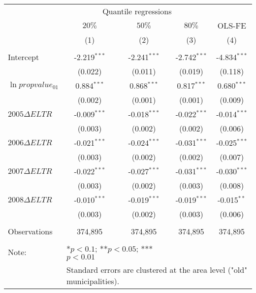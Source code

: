 \begin{table}[H]
  \centering
  \begin{tabular}{@{}lcccc@{}}
  \toprule
                         & \multicolumn{3}{c}{Quantile regressions} &           \\ \cmidrule(lr){2-4}
                         & $20\%$       & $50\%$      & $80\%$      & OLS-FE    \\
                         & (1)          & (2)         & (3)         & (4)       \\ \midrule
  \multicolumn{5}{l}{}                                                          \\
  Intercept & -2.219$^{***}$ & -2.241$^{***}$ & -2.742$^{***}$ & -4.834$^{***}$ \\
  & (0.022) & (0.011) & (0.019) & (0.118) \\
  $\ln{propvalue_{01}}$ & 0.884$^{***}$ & 0.868$^{***}$ & 0.817$^{***}$ & 0.680$^{***}$ \\
  & (0.002) & (0.001) & (0.001) & (0.009) \\
 $2005\Delta ELTR$ & -0.009$^{***}$ & -0.018$^{***}$ & -0.022$^{***}$ & -0.014$^{***}$ \\
  & (0.003) & (0.002) & (0.002) & (0.006) \\
 $2006\Delta ELTR$ & -0.021$^{***}$ & -0.024$^{***}$ & -0.031$^{***}$ & -0.025$^{***}$ \\
  & (0.003) & (0.002) & (0.002) & (0.007) \\
 $2007\Delta ELTR$ & -0.022$^{***}$ & -0.027$^{***}$ & -0.031$^{***}$ & -0.030$^{***}$ \\
  & (0.003) & (0.002) & (0.003) & (0.008) \\
 $2008\Delta ELTR$ & -0.010$^{***}$ & -0.019$^{***}$ & -0.019$^{***}$ & -0.015$^{**}$ \\
  & (0.003) & (0.002) & (0.003) & (0.006) \\ \midrule
  \multicolumn{5}{l}{}                                                          \\
  Observations & 374,895 & 374,895 & 374,895 & 374,895 \\
  \multicolumn{5}{l}{}                                                          \\ \midrule
  Note:                  & \multicolumn{2}{l}{*$p<0.1$; **$p<0.05$; ***$p<0.01$}      \\
   & \multicolumn{4}{l}{Standard errors are clustered at the area level ("old" municipalities).}
  \end{tabular}
  \end{table}